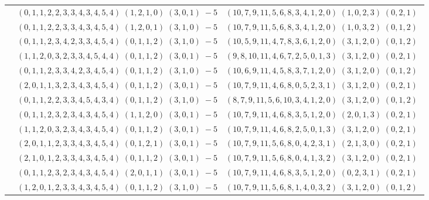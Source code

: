 \documentclass[11pt]{article}
\begin{document}
\begin{longtable}[l]{|c|c|c|}
 \cline{2-3} 
 & $(0 ,1 ,1 ,2 ,2 ,3 ,3 ,4 ,3 ,4 ,5 ,4) \;(1 ,2 ,1 ,0) \;(3 ,0 ,1) \;-5$ & $(10 ,7 ,9 ,11 ,5 ,6 ,8 ,3 ,4 ,1 ,2 ,0) \;(1 ,0 ,2 ,3) \;(0 ,2 ,1) \;$\\ 
 \cline{2-3} 
 & $(0 ,1 ,1 ,2 ,2 ,3 ,3 ,4 ,3 ,4 ,5 ,4) \;(1 ,2 ,0 ,1) \;(3 ,1 ,0) \;-5$ & $(10 ,7 ,9 ,11 ,5 ,6 ,8 ,3 ,4 ,1 ,2 ,0) \;(1 ,0 ,3 ,2) \;(0 ,1 ,2) \;$\\ 
 \cline{2-3} 
 & $(0 ,1 ,1 ,2 ,3 ,4 ,2 ,3 ,3 ,4 ,5 ,4) \;(0 ,1 ,1 ,2) \;(3 ,1 ,0) \;-5$ & $(10 ,5 ,9 ,11 ,4 ,7 ,8 ,3 ,6 ,1 ,2 ,0) \;(3 ,1 ,2 ,0) \;(0 ,1 ,2) \;$\\ 
 \cline{2-3} 
 & $(1 ,1 ,2 ,0 ,3 ,2 ,3 ,3 ,4 ,5 ,4 ,4) \;(0 ,1 ,1 ,2) \;(3 ,0 ,1) \;-5$ & $(9 ,8 ,10 ,11 ,4 ,6 ,7 ,2 ,5 ,0 ,1 ,3) \;(3 ,1 ,2 ,0) \;(0 ,2 ,1) \;$\\ 
 \cline{2-3} 
 & $(0 ,1 ,1 ,2 ,3 ,3 ,4 ,2 ,3 ,4 ,5 ,4) \;(0 ,1 ,1 ,2) \;(3 ,1 ,0) \;-5$ & $(10 ,6 ,9 ,11 ,4 ,5 ,8 ,3 ,7 ,1 ,2 ,0) \;(3 ,1 ,2 ,0) \;(0 ,1 ,2) \;$\\ 
 \cline{2-3} 
 & $(2 ,0 ,1 ,1 ,3 ,2 ,3 ,4 ,3 ,4 ,5 ,4) \;(0 ,1 ,1 ,2) \;(3 ,0 ,1) \;-5$ & $(10 ,7 ,9 ,11 ,4 ,6 ,8 ,0 ,5 ,2 ,3 ,1) \;(3 ,1 ,2 ,0) \;(0 ,2 ,1) \;$\\ 
 \cline{2-3} 
 & $(0 ,1 ,1 ,2 ,2 ,3 ,3 ,4 ,5 ,4 ,3 ,4) \;(0 ,1 ,1 ,2) \;(3 ,1 ,0) \;-5$ & $(8 ,7 ,9 ,11 ,5 ,6 ,10 ,3 ,4 ,1 ,2 ,0) \;(3 ,1 ,2 ,0) \;(0 ,1 ,2) \;$\\ 
 \cline{2-3} 
 & $(0 ,1 ,1 ,2 ,3 ,2 ,3 ,4 ,3 ,4 ,5 ,4) \;(1 ,1 ,2 ,0) \;(3 ,0 ,1) \;-5$ & $(10 ,7 ,9 ,11 ,4 ,6 ,8 ,3 ,5 ,1 ,2 ,0) \;(2 ,0 ,1 ,3) \;(0 ,2 ,1) \;$\\ 
 \cline{2-3} 
 & $(1 ,1 ,2 ,0 ,3 ,2 ,3 ,4 ,3 ,4 ,5 ,4) \;(0 ,1 ,1 ,2) \;(3 ,0 ,1) \;-5$ & $(10 ,7 ,9 ,11 ,4 ,6 ,8 ,2 ,5 ,0 ,1 ,3) \;(3 ,1 ,2 ,0) \;(0 ,2 ,1) \;$\\ 
 \cline{2-3} 
 & $(2 ,0 ,1 ,1 ,2 ,3 ,3 ,4 ,3 ,4 ,5 ,4) \;(0 ,1 ,2 ,1) \;(3 ,0 ,1) \;-5$ & $(10 ,7 ,9 ,11 ,5 ,6 ,8 ,0 ,4 ,2 ,3 ,1) \;(2 ,1 ,3 ,0) \;(0 ,2 ,1) \;$\\ 
 \cline{2-3} 
 & $(2 ,1 ,0 ,1 ,2 ,3 ,3 ,4 ,3 ,4 ,5 ,4) \;(0 ,1 ,1 ,2) \;(3 ,0 ,1) \;-5$ & $(10 ,7 ,9 ,11 ,5 ,6 ,8 ,0 ,4 ,1 ,3 ,2) \;(3 ,1 ,2 ,0) \;(0 ,2 ,1) \;$\\ 
 \cline{2-3} 
 & $(0 ,1 ,1 ,2 ,3 ,2 ,3 ,4 ,3 ,4 ,5 ,4) \;(2 ,0 ,1 ,1) \;(3 ,0 ,1) \;-5$ & $(10 ,7 ,9 ,11 ,4 ,6 ,8 ,3 ,5 ,1 ,2 ,0) \;(0 ,2 ,3 ,1) \;(0 ,2 ,1) \;$\\ 
 \cline{2-3} 
 & $(1 ,2 ,0 ,1 ,2 ,3 ,3 ,4 ,3 ,4 ,5 ,4) \;(0 ,1 ,1 ,2) \;(3 ,1 ,0) \;-5$ & $(10 ,7 ,9 ,11 ,5 ,6 ,8 ,1 ,4 ,0 ,3 ,2) \;(3 ,1 ,2 ,0) \;(0 ,1 ,2) \;$\\ 

\end{longtable}
\end{document}
